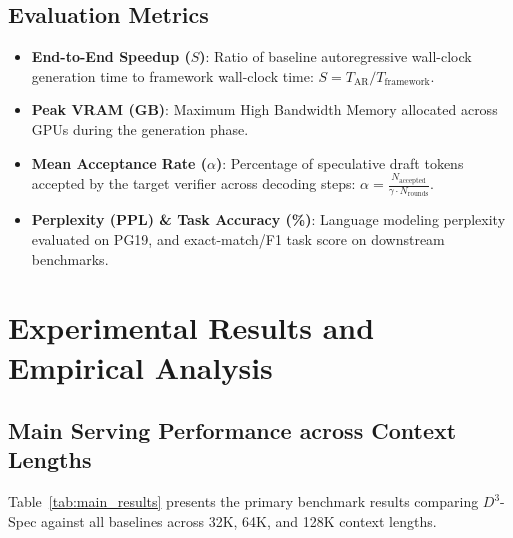 \documentclass[runningheads]{llncs}
\begin{document}
\subsection{Evaluation Metrics}
\begin{itemize}
    \item \textbf{End-to-End Speedup ($S$)}: Ratio of baseline autoregressive wall-clock generation time to framework wall-clock time: $S = T_{\text{AR}} / T_{\text{framework}}$.
    \item \textbf{Peak VRAM (GB)}: Maximum High Bandwidth Memory allocated across GPUs during the generation phase.
    \item \textbf{Mean Acceptance Rate ($\alpha$)}: Percentage of speculative draft tokens accepted by the target verifier across decoding steps: $\alpha = \frac{N_{\text{accepted}}}{\gamma \cdot N_{\text{rounds}}}$.
    \item \textbf{Perplexity (PPL) \& Task Accuracy (\%)}: Language modeling perplexity evaluated on PG19, and exact-match/F1 task score on downstream benchmarks.
\end{itemize}

\section{Experimental Results and Empirical Analysis}
\label{sec:results}

\subsection{Main Serving Performance across Context Lengths}
Table~\ref{tab:main_results} presents the primary benchmark results comparing $D^3$-Spec against all baselines across 32K, 64K, and 128K context lengths.
\end{document}
